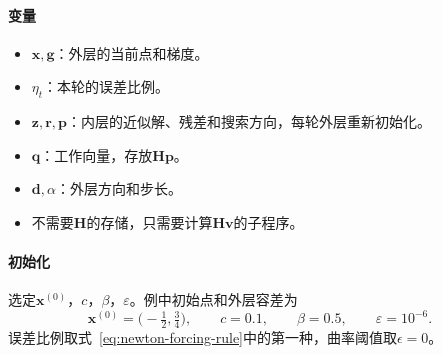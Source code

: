 \paragraph{变量}
\begin{itemize}
 \item $\bm{x},\bm{g}$：外层的当前点和梯度。
 \item $\eta_t$：本轮的误差比例。
 \item $\bm{z},\bm{r},\bm{p}$：内层的近似解、残差和搜索方向，每轮外层重新初始化。
 \item $\bm{q}$：工作向量，存放$\bm{H}\bm{p}$。
 \item $\bm{d},\alpha$：外层方向和步长。
 \item 不需要$\bm{H}$的存储，只需要计算$\bm{H}\bm{v}$的子程序。
\end{itemize}

\paragraph{初始化}
选定$\bm{x}^{(0)}$，$c$，$\beta$，$\varepsilon$。例中初始点和外层容差为
\[
 \bm{x}^{(0)}=\bigl(-\tfrac12,\tfrac34\bigr),\qquad c=0.1,\qquad \beta=0.5,\qquad \varepsilon=10^{-6}.
\]
误差比例取式~\eqref{eq:newton-forcing-rule}中的第一种，曲率阈值取$\epsilon=0$。

